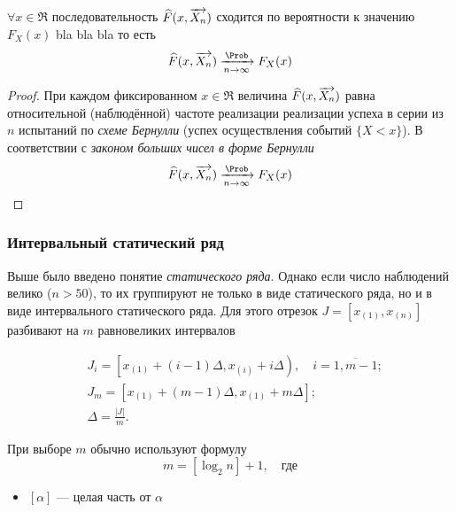 \begin{thm}
	$\forall x \in \Re$ последовательность $\widehat{F}(x, \overrightarrow{X_n})$ сходится по вероятности к значению $F_{X}(x)$ bla bla bla то есть
	\begin{equation}
		\widehat{F}(x, \vvec{X_n}) \xrightarrow[n\to\infty]{\Prob} F_{X}(x)
	\end{equation}
\end{thm}
\begin{proof}
	При каждом фиксированном $x \in \Re$ величина $\widehat{F}(x, \overrightarrow{X_n})$ равна относительной (наблюдённой) частоте реализации реализации успеха в серии из $n$ испытаний по \emph{схеме Бернулли} (успех осуществления событий $\{ X < x \}$). В соответствии с \emph{законом больших чисел в форме Бернулли}
	\[
		\widehat{F}(x, \vvec{X_n}) \xrightarrow[n\to\infty]{\Prob} F_{X}(x)
	\]
\end{proof}


\subsubsection{Интервальный статический ряд}

Выше было введено понятие \emph{статического ряда}. Однако если число наблюдений велико ($n > 50$), то их группируют не только в виде статического ряда, но и в виде интервального статического ряда. Для этого отрезок $J = [x_{(1)}, x_{(n)}]$ разбивают на $m$ равновеликих интервалов

\begin{align*}
	&J_i = \left[ x_{(1)} + (i - 1)\Delta, x_{(i)} + i\Delta \right), \quad i = \overline{1, m-1};
	\\
	&J_m = \left[ x_{(1)} + (m-1)\Delta, x_{(1)} + m\Delta  \right];
	\\
	&\Delta = \frac{|J|}{m}.
\end{align*}

\begin{rem}
	При выборе $m$ обычно используют формулу
	\begin{equation}
		m = [ \log_2 n ] + 1, \quad \text{где}
	\end{equation}
	\begin{itemize}
		\item $[\alpha]$ --- целая часть от $\alpha$
	\end{itemize}
\end{rem}

